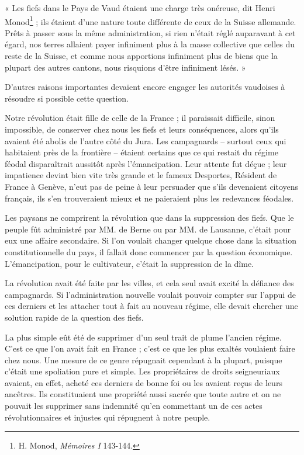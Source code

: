 \documentclass[french,twoside]{book} %
\newenvironment{quoteblock}%
  {\begin{quoting}}
  {\end{quoting}}
\newenvironment{quotebar}{%
    \def\FrameCommand{{\color{rubric!10!}\vrule width 0.5em} \hspace{0.9em}}%
    \def\OuterFrameSep{\itemsep} %
    \MakeFramed {\advance\hsize-\width \FrameRestore}
  }%
  {%
    \endMakeFramed
  }
\renewenvironment{quoteblock}%
  {%
    \savenotes
    \setstretch{0.9}
    \begin{quotebar}
  }
  {%
    \end{quotebar}
    \spewnotes
  }
\begin{document}
\begin{quoteblock}
 \noindent « Les fiefs dans le Pays de Vaud étaient une charge très onéreuse, dit Henri Monod\footnote{H. Monod, \emph{Mémoires I} 143-144.} ; ils étaient d’une nature toute différente de ceux de la Suisse allemande. Prêts à passer sous la même administration, si rien n’était réglé auparavant à cet égard, nos terres allaient payer infiniment plus à la masse collective que celles du reste de la Suisse, et comme nous apportions infiniment plus de biens que la plupart des autres cantons, nous risquions d’être infiniment lésés. »
 \end{quoteblock}

\noindent D’autres raisons importantes devaient encore engager les autorités vaudoises à résoudre si possible cette question.\par
Notre révolution était fille de celle de la France ; il paraissait difficile, sinon impossible, de conserver chez nous les fiefs et leurs conséquences, alors qu’ils avaient été abolis de l’autre côté du Jura. Les campagnards – surtout ceux qui habitaient près de la frontière – étaient certains que ce qui restait du régime féodal disparaîtrait aussitôt après l’émancipation. Leur attente fut déçue ; leur impatience devint bien vite très grande et le fameux Desportes, Résident de France à Genève, n’eut pas de peine à leur persuader que s’ils devenaient citoyens français, ils s’en trouveraient mieux et ne paieraient plus les redevances féodales.\par
Les paysans ne comprirent la révolution que dans la suppression des fiefs. Que le peuple fût administré par MM. de Berne ou par MM. de Lausanne, c’était pour eux une affaire secondaire. Si l’on voulait changer quelque chose dans la situation constitutionnelle du pays, il fallait donc commencer par la question économique. L’émancipation, pour le cultivateur, c’était la suppression de la dîme.\par
La révolution avait été faite par les villes, et cela seul avait excité la défiance des campagnards. Si l’administration nouvelle voulait pouvoir compter sur l’appui de ces derniers et les attacher tout à fait au nouveau régime, elle devait chercher une solution rapide de la question des fiefs.\par
La plus simple eût été de supprimer d’un seul trait de plume l’ancien régime. C’est ce que l’on avait fait en France ; c’est ce que les plus exaltés voulaient faire chez nous. Une mesure de ce genre répugnait cependant à la plupart, puisque c’était une spoliation pure et simple. Les propriétaires de droits seigneuriaux avaient, en effet, acheté ces derniers de bonne foi ou les avaient reçus de leurs ancêtres. Ils constituaient une propriété aussi sacrée que toute autre et on ne pouvait les supprimer sans indemnité qu’en commettant un de ces actes révolutionnaires et injustes qui répugnent à notre peuple.\par
\end{document}
